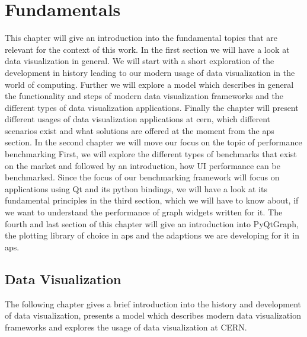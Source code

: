 
\chapter{Fundamentals}
\label{ch:fundamentals}

This chapter will give an introduction into the fundamental topics that are relevant for the context of this work. In the first section we will have a look at data visualization in general. We will start with a short exploration of the development in history leading to our modern usage of data visualization in the world of computing. Further we will explore a model which describes in general the functionality and steps of modern data visualization frameworks and the different types of data visualization applications. Finally the chapter will present different usages of data visualization applications at \gls{cern}, which different scenarios exist and what solutions are offered at the moment from the \gls{aps} section.
In the second chapter we will move our focus on the topic of performance benchmarking First, we will explore the different types of benchmarks that exist on the market and followed by an introduction, how UI performance can be benchmarked.
Since the focus of our benchmarking framework will focus on applications using Qt and its python bindings, we will have a look at its fundamental principles in the third section, which we will have to know about, if we want to understand the performance of graph widgets written for it. The fourth and last section of this chapter will give an introduction into PyQtGraph, the plotting library of choice in \gls{aps} and the adaptions we are developing for it in \gls{aps}.





\section{Data Visualization}
\label{sec:fundamentals:charting}

The following chapter gives a brief introduction into the history and development of data visualization, presents a model which describes modern data visualization frameworks and explores the usage of data visualization at CERN.




